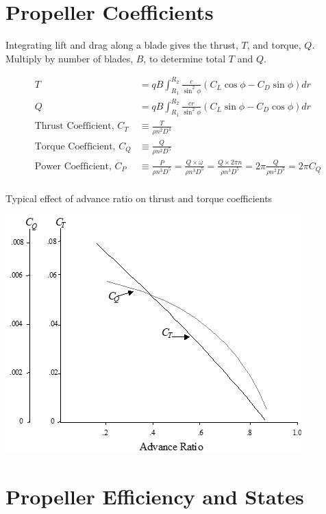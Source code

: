 \documentclass[
]{book}
\begin{document}
\hypertarget{propeller-coefficients}{%
\section{Propeller Coefficients}\label{propeller-coefficients}}

Integrating lift and drag along a blade gives the thrust, \(T\), and torque, \(Q\).
Multiply by number of blades, \(B\), to determine total \(T\) and \(Q\).

\begin{align}
T &= qB \int_{R_1}^{R_2} \frac{c}{\sin^2 \phi} \left( C_L \cos \phi - C_D \sin \phi \right) dr \\
Q &= qB \int_{R_1}^{R_2} \frac{cr}{\sin^2 \phi} \left( C_L \sin \phi - C_D \cos \phi \right) dr \\
\text{Thrust Coefficient, } C_T &\equiv \frac{T}{\rho n^2 D^4} \\
\text{Torque Coefficient, } C_Q &\equiv \frac{Q}{\rho n^2 D^5} \\
\text{Power Coefficient, } C_P &\equiv \frac{P}{\rho n^3 D^5} = \frac{Q \times \omega}{\rho n^3 D^5} = \frac{Q \times 2 \pi n}{\rho n^3 D^5} = 2 \pi \frac{Q}{\rho n^2 D^5} = 2 \pi C_Q \\
\end{align}

Typical effect of advance ratio on thrust and torque coefficients

\includegraphics[width=4.49931in,height=3.62431in]{media/11/image13.png}

\hypertarget{propeller-efficiency-and-states}{%
\section{Propeller Efficiency and States}\label{propeller-efficiency-and-states}}
\end{document}
